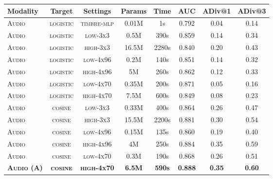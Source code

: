 \begin{table}[ht]
\label{tbl:results}
\centering
\scriptsize
\begin{tabular}{lccccccc}
\toprule
Modality & Target & Settings                & Params         & Time    & AUC        & ADiv@1           & ADiv@3           \\
\midrule
\textsc{Audio} & \textsc{logistic} & \textsc{timbre-mlp}                   &  0.01M              & 1s              & 0.792               & 0.04             & 0.14             \\
\textsc{Audio} & \textsc{logistic} & \textsc{low-3x3}           & 0.5M           & 390s          & 0.859          & 0.14          & 0.34         \\
\textsc{Audio} & \textsc{logistic} & \textsc{high-3x3}          & 16.5M          & 2280s         & 0.840          & 0.20          & 0.43         \\
\textsc{Audio} & \textsc{logistic} & \textsc{low-4x96}          & 0.2M           & 140s          & 0.851          & 0.14          & 0.32         \\
\textsc{Audio} & \textsc{logistic} & \textsc{high-4x96}         & 5M             & 260s          & 0.862          & 0.12          & 0.33         \\
\textsc{Audio} & \textsc{logistic} & \textsc{low-4x70} & 0.35M & 200s & 0.871 & 0.05 & 0.16 \\
\textsc{Audio} & \textsc{logistic} & \textsc{high-4x70}         & 7.5M           & 600s          & 0.849          & 0.08          & 0.23         \\
\textsc{Audio} & \textsc{cosine} & \textsc{low-3x3}            & 0.33M          & 400s          & 0.864          & 0.26          & 0.47        \\
\textsc{Audio} & \textsc{cosine} & \textsc{high-3x3}           & 15.5M          & 2200s         & 0.881          & 0.30          & 0.54        \\
\textsc{Audio} & \textsc{cosine} & \textsc{low-4x96}           & 0.15M          & 135s          & 0.860          & 0.19          & 0.40        \\
\textsc{Audio} & \textsc{cosine} & \textsc{high-4x96}          & 4M             & 250s          & 0.884          & 0.35          & 0.59         \\
\textsc{Audio} & \textsc{cosine} & \textsc{low-4x70}           & 0.3M           & 190s          & 0.868          & 0.26          & 0.51       \\
\textbf{\textsc{Audio (A)}} & \textbf{\textsc{cosine}} & \textbf{\textsc{high-4x70}} & \textbf{6.5M}  & \textbf{590s} & \textbf{0.888} & \textbf{0.35} & \textbf{0.60} \\

\end{tabular}
\end{table}
